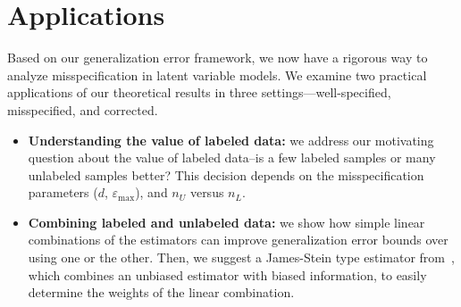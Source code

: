 \section{Applications}\label{sec:applications}
\vspace{-.5em}
Based on our generalization error framework, we now have a rigorous way to analyze misspecification in latent variable models. We examine two practical applications of our theoretical results in three settings---well-specified, misspecified, and corrected.
\begin{itemize}
    \item \textbf{Understanding the value of labeled data:} we address our motivating question about the value of labeled data–is a few labeled samples or many unlabeled samples better? This decision depends on the misspecification parameters ($d$, $\varepsilon_{\max}$), and $n_U$ versus $n_L$.
    \item \textbf{Combining labeled and unlabeled data:} we show how simple linear combinations of the estimators can improve generalization error bounds over using one or the other. Then, we suggest a James-Stein type estimator from~\cite{GreenStrawderman2001}, which combines an unbiased estimator with biased information, to easily determine the weights of the linear combination. %
\end{itemize}



